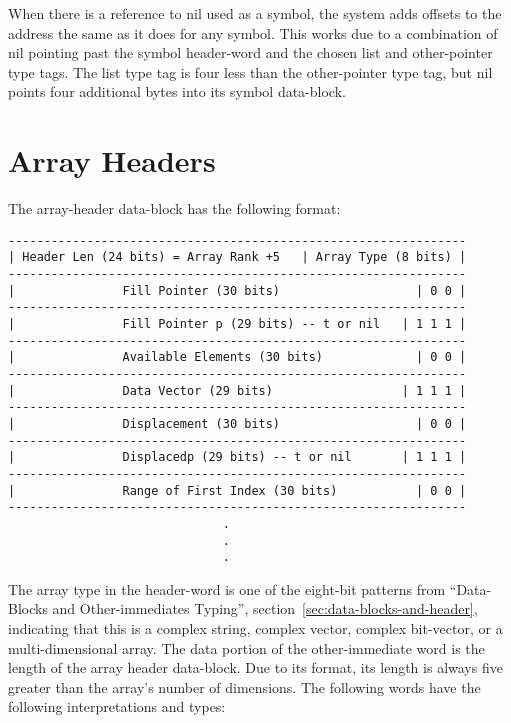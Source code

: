 When there is a reference to nil used as a symbol, the system adds offsets to
the address the same as it does for any symbol.  This works due to a
combination of nil pointing past the symbol header-word and the chosen list and
other-pointer type tags.  The list type tag is four less than the other-pointer
type tag, but nil points four additional bytes into its symbol data-block.



\section{Array Headers}

The array-header data-block has the following format:
\begin{verbatim}
----------------------------------------------------------------
| Header Len (24 bits) = Array Rank +5   | Array Type (8 bits) |
----------------------------------------------------------------
|               Fill Pointer (30 bits)                   | 0 0 | 
----------------------------------------------------------------
|               Fill Pointer p (29 bits) -- t or nil   | 1 1 1 |
----------------------------------------------------------------
|               Available Elements (30 bits)             | 0 0 | 
----------------------------------------------------------------
|               Data Vector (29 bits)                  | 1 1 1 | 
----------------------------------------------------------------
|               Displacement (30 bits)                   | 0 0 | 
----------------------------------------------------------------
|               Displacedp (29 bits) -- t or nil       | 1 1 1 | 
----------------------------------------------------------------
|               Range of First Index (30 bits)           | 0 0 | 
----------------------------------------------------------------
                              .
                              .
                              .

\end{verbatim}
The array type in the header-word is one of the eight-bit patterns from 
``Data-Blocks and Other-immediates Typing'', section~\ref{sec:data-blocks-and-header}, indicating that this is a complex
string, complex vector, complex bit-vector, or a multi-dimensional array.  The
data portion of the other-immediate word is the length of the array header
data-block.  Due to its format, its length is always five greater than the
array's number of dimensions.  The following words have the following
interpretations and types:
